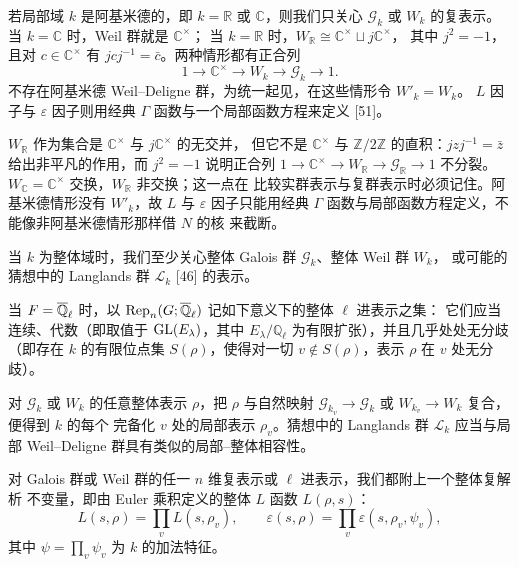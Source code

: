 若局部域 $k$ 是阿基米德的，即 $k=\mathbb{R}$ 或 $\mathbb{C}$，则我们只关心
$\mathcal{G}_k$ 或 $W_k$ 的复表示。当 $k=\mathbb{C}$ 时，Weil 群就是 $\mathbb{C}^\times$；
当 $k=\mathbb{R}$ 时，$W_{\mathbb{R}}\cong\mathbb{C}^\times\sqcup j\mathbb{C}^\times$，
其中 $j^2=-1$，且对 $c\in\mathbb{C}^\times$ 有 $jcj^{-1}=\bar c$。两种情形都有正合列
\[
  1\longrightarrow\mathbb{C}^\times\longrightarrow W_k
  \longrightarrow\mathcal{G}_k\longrightarrow 1.
\]
不存在阿基米德 Weil--Deligne 群，为统一起见，在这些情形令 $W'_k=W_k$。
$L$ 因子与 $\varepsilon$ 因子则用经典 $\Gamma$ 函数与一个局部函数方程来定义 [51]。
\begin{annote}
$W_{\mathbb{R}}$ 作为集合是 $\mathbb{C}^\times$ 与 $j\mathbb{C}^\times$ 的无交并，
但它不是 $\mathbb{C}^\times$ 与 $\mathbb{Z}/2\mathbb{Z}$ 的直积：$jzj^{-1}=\bar z$
给出非平凡的作用，而 $j^2=-1$ 说明正合列
$1\to\mathbb{C}^\times\to W_{\mathbb{R}}\to\mathcal{G}_{\mathbb{R}}\to1$
不分裂。$W_{\mathbb{C}}=\mathbb{C}^\times$ 交换，$W_{\mathbb{R}}$ 非交换；这一点在
比较实群表示与复群表示时必须记住。阿基米德情形没有 $W'_k$，故 $L$ 与 $\varepsilon$
因子只能用经典 $\Gamma$ 函数与局部函数方程定义，不能像非阿基米德情形那样借 $N$ 的核
来截断。
\par\vspace{0.15em}{\raggedleft 【来源：Tate 1979, \S1--2（A）】\par}
\end{annote}

当 $k$ 为整体域时，我们至少关心整体 Galois 群 $\mathcal{G}_k$、整体 Weil 群 $W_k$，
或可能的猜想中的 Langlands 群 $\mathcal{L}_k$ [46] 的表示。

当 $F=\overline{\mathbb{Q}}_\ell$ 时，以 $\operatorname{Rep}_n(G;\overline{\mathbb{Q}}_\ell)$ 记如下意义下的整体 $\ell$ 进表示之集：
它们应当连续、代数（即取值于 $\mathrm{GL}(E_\lambda)$，其中 $E_\lambda/\mathbb{Q}_\ell$
为有限扩张），并且几乎处处无分歧（即存在 $k$ 的有限位点集 $S(\rho)$，使得对一切
$v\notin S(\rho)$，表示 $\rho$ 在 $v$ 处无分歧）。

对 $\mathcal{G}_k$ 或 $W_k$ 的任意整体表示 $\rho$，把 $\rho$ 与自然映射
$\mathcal{G}_{k_v}\to\mathcal{G}_k$ 或 $W_{k_v}\to W_k$ 复合，便得到 $k$ 的每个
完备化 $v$ 处的局部表示 $\rho_v$。猜想中的 Langlands 群 $\mathcal{L}_k$ 应当与局部
Weil--Deligne 群具有类似的局部--整体相容性。

对 Galois 群或 Weil 群的任一 $n$ 维复表示或 $\ell$ 进表示，我们都附上一个整体复解析
不变量，即由 Euler 乘积定义的整体 $L$ 函数 $L(\rho,s)$：
\[
  L(s,\rho)=\prod_v L(s,\rho_v),\qquad
  \varepsilon(s,\rho)=\prod_v\varepsilon(s,\rho_v,\psi_v),
\]
其中 $\psi=\prod_v\psi_v$ 为 $k$ 的加法特征。

